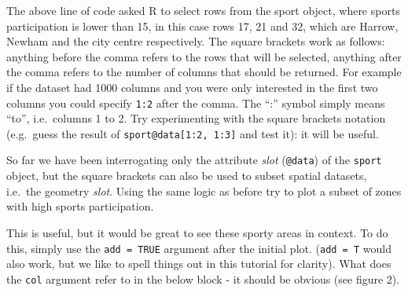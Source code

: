 \documentclass[]{article}
\newenvironment{Shaded}{}{}
\newcommand{\KeywordTok}[1]{\textcolor[rgb]{0.00,0.44,0.13}{\textbf{{#1}}}}
\newcommand{\DataTypeTok}[1]{\textcolor[rgb]{0.56,0.13,0.00}{{#1}}}
\newcommand{\DecValTok}[1]{\textcolor[rgb]{0.25,0.63,0.44}{{#1}}}
\newcommand{\StringTok}[1]{\textcolor[rgb]{0.25,0.44,0.63}{{#1}}}
\newcommand{\CommentTok}[1]{\textcolor[rgb]{0.38,0.63,0.69}{\textit{{#1}}}}
\newcommand{\OtherTok}[1]{\textcolor[rgb]{0.00,0.44,0.13}{{#1}}}
\newcommand{\NormalTok}[1]{{#1}}
\begin{document}
The above line of code asked R to select rows from the sport object,
where sports participation is lower than 15, in this case rows 17, 21
and 32, which are Harrow, Newham and the city centre respectively. The
square brackets work as follows: anything before the comma refers to the
rows that will be selected, anything after the comma refers to the
number of columns that should be returned. For example if the dataset
had 1000 columns and you were only interested in the first two columns
you could specify \texttt{1:2} after the comma. The ``:'' symbol simply
means ``to'', i.e.~columns 1 to 2. Try experimenting with the square
brackets notation (e.g.~guess the result of
\texttt{sport@data{[}1:2, 1:3{]}} and test it): it will be useful.

So far we have been interrogating only the attribute \emph{slot}
(\texttt{@data}) of the \texttt{sport} object, but the square brackets
can also be used to subset spatial datasets, i.e.~the geometry
\emph{slot}. Using the same logic as before try to plot a subset of
zones with high sports participation.

\begin{Shaded}
\end{Shaded}

This is useful, but it would be great to see these sporty areas in
context. To do this, simply use the \texttt{add = TRUE} argument after
the initial plot. (\texttt{add = T} would also work, but we like to
spell things out in this tutorial for clarity). What does the
\texttt{col} argument refer to in the below block - it should be obvious
(see figure 2).

\begin{Shaded}
\end{Shaded}
\end{document}
